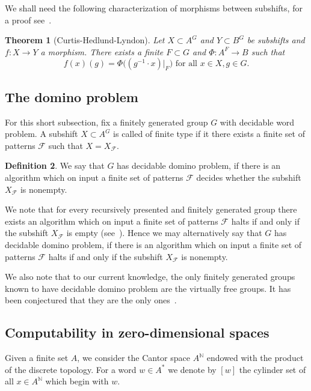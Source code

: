 \documentclass{article}
\newtheorem{theorem}{Theorem}[section]
\theoremstyle{definition}
\newtheorem{definition}[theorem]{Definition}
\theoremstyle{plain}
\newcommand{\NN}{\mathbb{N}}
\newcommand{\FF}{\mathcal{F}}
\begin{document}
We shall need the following characterization of morphisms between subshifts, for a proof see~\cite[Theorem 1.8.1]{ceccherini2010cellular}.

\begin{theorem}[Curtis-Hedlund-Lyndon]
    Let $X\subset A^G$ and $Y\subset B^G$ be subshifts and $f\colon X \to Y$ a morphism. There exists a finite $F\subset G$ and $\Phi \colon A^F\to B$ such that \[  f(x)(g) = \Phi\bigl((g^{-1}\cdot x) |_F\bigr) \mbox{ for all } x \in X, g \in G. \]
\end{theorem}

\subsection{The domino problem}

For this short subsection, fix a finitely generated group $G$ with decidable word problem. A subshift $X\subset A^G$ is called of finite type if it there exists a finite set of patterns $\FF$ such that $X=X_{\FF}$.

\begin{definition}
    We say that $G$ has decidable domino problem, if there is an algorithm which on input a finite set of patterns $\FF$ decides whether the subshift $X_{\FF}$ is nonempty.
\end{definition}

We note that for every recursively presented and finitely generated group there exists an algorithm which on input a finite set of patterns $\FF$ halts if and only if the subshift $X_{\FF}$ is empty (see~\cite[Proposition 9.3.29]{ABJ2018}). Hence we may alternatively say that $G$ has decidable domino problem, if there is an algorithm which on input a finite set of patterns $\FF$ halts if and only if the subshift $X_{\FF}$ is nonempty.

We also note that to our current knowledge, the only finitely generated groups known to have decidable domino problem are the virtually free groups. It has been conjectured that they are the only ones~\cite{ballier_domino_2018}.

\subsection{Computability in zero-dimensional spaces}

Given a finite set $A$,  we consider the Cantor space $A^{\NN}$ endowed with the product of the discrete topology. For a word $w \in A^*$ we denote by $[w]$ the cylinder set of all $x\in A^{\NN}$ which begin with $w$.
\end{document}
